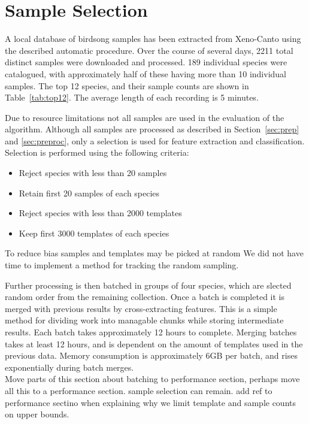 \section{Sample Selection}
A local database of birdsong samples has been extracted from Xeno-Canto using
the described automatic procedure.
Over the course of several days, 2211 total distinct samples were downloaded and
processed.
189 individual species were catalogued, with approximately half of these having
more than 10 individual samples.
The top 12 species, and their sample counts are shown in Table~\ref{tab:top12}.
The average length of each recording is 5 minutes.

Due to resource limitations not all samples are used in the evaluation of the
algorithm.
Although all samples are processed as described in Section~\ref{sec:prep} and
\ref{sec:preproc}, only a selection is used for feature extraction and
classification.
Selection is performed using the following criteria:
\begin{itemize}
  \item Reject species with less than 20 samples
  \item Retain first 20 samples of each species
  \item Reject species with less than 2000 templates
  \item Keep first 3000 templates of each species
\end{itemize}
To reduce bias samples and templates may be picked at random
We did not have time to implement a method for tracking the random sampling.

Further processing is then batched in groups of four species, which are slected
random order from the remaining collection.
Once a batch is completed it is merged with previous results by
cross-extracting features.
This is a simple method for dividing work into managable chunks while storing
intermediate results.
Each batch takes approximately 12 hours to complete.
Merging batches takes at least 12 hours, and is dependent on the amount of
templates used in the previous data.
Memory consumption is approximately 6GB per batch, and rises exponentially
during batch merges.\\

Move parts of this section about batching to performance section,
perhaps move all this to a performance section. sample selection can remain.
add ref to performance sectino when explaining why we limit template and
sample counts on upper bounds.


